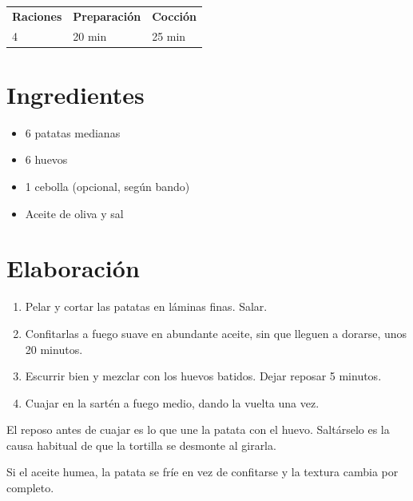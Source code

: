 \documentclass[a4paper,11pt]{article}
\makeatletter
\newcommand{\ficha}[3]{%
    \begin{center}
        \begin{tabular}{l@{\quad}l@{\quad}l}
            \textbf{Raciones} & \textbf{Preparación} & \textbf{Cocción} \\
            #1                & #2                   & #3               \\
        \end{tabular}
    \end{center}
}
\makeatother
\begin{document}
\begin{center}
    {\LARGE\bfseries \eltitulo}
\end{center}

\ficha{4}{20 min}{25 min}

\section{Ingredientes}

\begin{itemize}
    \item 6 patatas medianas
    \item 6 huevos
    \item 1 cebolla (opcional, según bando)
    \item Aceite de oliva y sal
\end{itemize}

\section{Elaboración}

\begin{enumerate}
    \item Pelar y cortar las patatas en láminas finas. Salar.
    \item Confitarlas a fuego suave en abundante aceite, sin que lleguen a
          dorarse, unos 20 minutos.
    \item Escurrir bien y mezclar con los huevos batidos. Dejar reposar
          5 minutos.
    \item Cuajar en la sartén a fuego medio, dando la vuelta una vez.
\end{enumerate}

\begin{nota}[Truco]
    El reposo antes de cuajar es lo que une la patata con el huevo. Saltárselo
    es la causa habitual de que la tortilla se desmonte al girarla.
\end{nota}

\begin{aviso}[Cuidado]
    Si el aceite humea, la patata se fríe en vez de confitarse y la textura
    cambia por completo.
\end{aviso}
\end{document}

